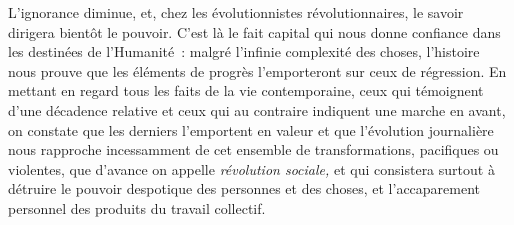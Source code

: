 \documentclass[french,twoside]{book} %
\newcommand\chaptercont{} %
\begin{document}
\chaptercont
\noindent L’ignorance diminue, et, chez les évolutionnistes révolutionnaires, le savoir dirigera bientôt le pouvoir. C’est là le fait capital qui nous donne confiance dans les destinées de l’Humanité : malgré l’infinie complexité des choses, l’histoire nous prouve que les éléments de progrès l’emporteront sur ceux de régression. En mettant en regard tous les faits de la vie contemporaine, ceux  qui témoignent d’une décadence relative et ceux qui au contraire indiquent une marche en avant, on constate que les derniers l’emportent en valeur et que l’évolution journalière nous rapproche incessamment de cet ensemble de transformations, pacifiques ou violentes, que d’avance on appelle \emph{révolution sociale,} et qui consistera surtout à détruire le pouvoir despotique des personnes et des choses, et l’accaparement personnel des produits du travail collectif.\par
\end{document}
